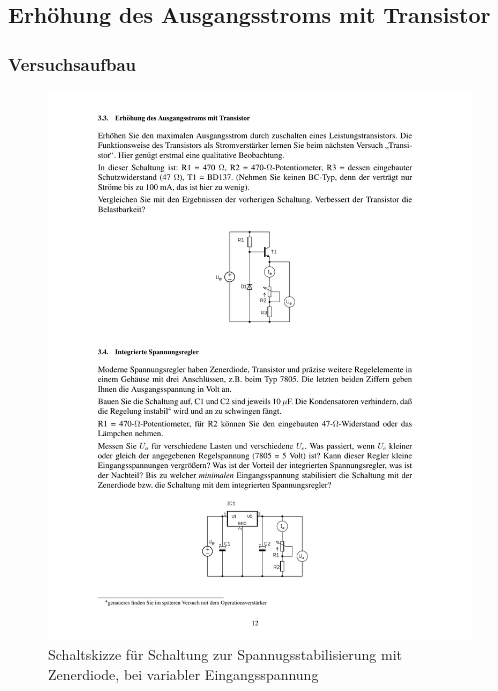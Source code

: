 \documentclass[12pt,a4paper]{article}
\begin{document}
\subsection{Erhöhung des Ausgangsstroms mit Transistor}
\subsubsection{Versuchsaufbau}

\begin{figure}[H] 
  \centering
    \includegraphics[trim = 10mm 160mm 10mm 70mm, clip, scale = 1]{ep2_14[Page12].pdf}
  	\caption[Schaltskizze für Schaltung zur Spannugsstabilisierung mit Zenerdiode, bei variabler Eingangsspannung]{Schaltskizze für Schaltung zur Spannugsstabilisierung mit Zenerdiode, bei variabler Eingangsspannung\footnotemark}
  \label{fig:2_10}
\end{figure}
\end{document}
